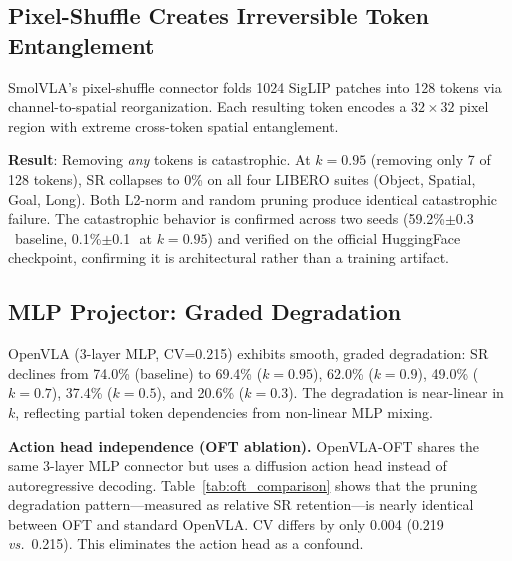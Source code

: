 \documentclass[10pt,letterpaper]{article}
\newcommand{\pp}{\,\text{pp}}
\newcommand{\vs}{\textit{vs.}}
\begin{document}
\subsection{Pixel-Shuffle Creates Irreversible Token Entanglement}
\label{sec:pixelshuffle}

SmolVLA's pixel-shuffle connector folds 1024 SigLIP patches into 128 tokens via channel-to-spatial reorganization. Each resulting token encodes a $32 \times 32$ pixel region with extreme cross-token spatial entanglement.

\textbf{Result}: Removing \emph{any} tokens is catastrophic. At $k\!=\!0.95$ (removing only 7 of 128 tokens), SR collapses to 0\% on all four LIBERO suites (Object, Spatial, Goal, Long). Both L2-norm and random pruning produce identical catastrophic failure. The catastrophic behavior is confirmed across two seeds (59.2\%$\pm$0.3\pp\ baseline, 0.1\%$\pm$0.1\pp\ at $k\!=\!0.95$) and verified on the official HuggingFace checkpoint, confirming it is architectural rather than a training artifact.

\subsection{MLP Projector: Graded Degradation}
\label{sec:mlp}

OpenVLA (3-layer MLP, CV=0.215) exhibits smooth, graded degradation: SR declines from 74.0\% (baseline) to 69.4\% ($k\!=\!0.95$), 62.0\% ($k\!=\!0.9$), 49.0\% ($k\!=\!0.7$), 37.4\% ($k\!=\!0.5$), and 20.6\% ($k\!=\!0.3$). The degradation is near-linear in $k$, reflecting partial token dependencies from non-linear MLP mixing.

\textbf{Action head independence (OFT ablation).} OpenVLA-OFT shares the same 3-layer MLP connector but uses a diffusion action head instead of autoregressive decoding. Table~\ref{tab:oft_comparison} shows that the pruning degradation pattern---measured as relative SR retention---is nearly identical between OFT and standard OpenVLA. CV differs by only 0.004 (0.219 \vs\ 0.215). This eliminates the action head as a confound.
\end{document}
